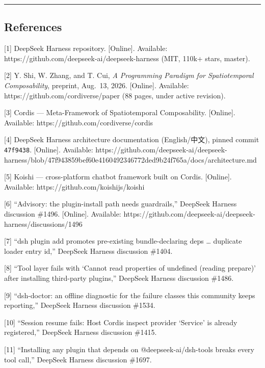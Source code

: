 \documentclass[
]{article}
\begin{document}
\begin{center}\rule{0.5\linewidth}{0.5pt}\end{center}

\subsection{References}\label{references}

{[}1{]} DeepSeek Harness repository. {[}Online{]}. Available:
https://github.com/deepseek-ai/deepseek-harness (MIT, 110k+ stars,
master).

{[}2{]} Y. Shi, W. Zhang, and T. Cui, \emph{A Programming Paradigm for
Spatiotemporal Composability}, preprint, Aug.~13, 2026. {[}Online{]}.
Available: https://github.com/cordiverse/paper (88 pages, under active
revision).

{[}3{]} Cordis --- Meta-Framework of Spatiotemporal Composability.
{[}Online{]}. Available: https://github.com/cordiverse/cordis

{[}4{]} DeepSeek Harness architecture documentation (English/中文),
pinned commit \texttt{47f9438}. {[}Online{]}. Available:
https://github.com/deepseek-ai/deepseek-harness/blob/47f943859bef60e4160492346772ded9b24f765a/docs/architecture.md

{[}5{]} Koishi --- cross-platform chatbot framework built on Cordis.
{[}Online{]}. Available: https://github.com/koishijs/koishi

{[}6{]} ``Advisory: the plugin-install path needs guardrails,'' DeepSeek
Harness discussion \#1496. {[}Online{]}. Available:
https://github.com/deepseek-ai/deepseek-harness/discussions/1496

{[}7{]} ``dsh plugin add promotes pre-existing bundle-declaring deps
\ldots{} duplicate loader entry id,'' DeepSeek Harness discussion
\#1404.

{[}8{]} ``Tool layer fails with `Cannot read properties of undefined
(reading prepare)' after installing third-party plugins,'' DeepSeek
Harness discussion \#1486.

{[}9{]} ``dsh-doctor: an offline diagnostic for the failure classes this
community keeps reporting,'' DeepSeek Harness discussion \#1534.

{[}10{]} ``Session resume fails: Host Cordis inspect provider `Service'
is already registered,'' DeepSeek Harness discussion \#1415.

{[}11{]} ``Installing any plugin that depends on @deepseek-ai/dsh-tools
breaks every tool call,'' DeepSeek Harness discussion \#1697.
\end{document}
